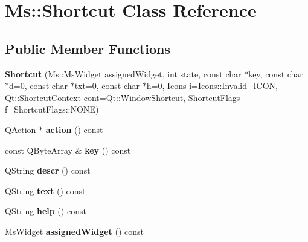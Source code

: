 \hypertarget{class_ms_1_1_shortcut}{}\section{Ms\+:\+:Shortcut Class Reference}
\label{class_ms_1_1_shortcut}
\subsection*{Public Member Functions}
\begin{DoxyCompactItemize}
\item 
\mbox{\label{class_ms_1_1_shortcut_ab4a874995fd1f7090eb9749d0b60297b}} 
{\bfseries Shortcut} (Ms\+::\+Ms\+Widget assigned\+Widget, int state, const char $\ast$key, const char $\ast$d=0, const char $\ast$txt=0, const char $\ast$h=0, Icons i=Icons\+::\+Invalid\+\_\+\+I\+C\+ON, Qt\+::\+Shortcut\+Context cont=Qt\+::\+Window\+Shortcut, Shortcut\+Flags f=Shortcut\+Flags\+::\+N\+O\+NE)
\item 
\mbox{\label{class_ms_1_1_shortcut_ac0c61a55d63d4387fcad2c9fefb4f341}} 
Q\+Action $\ast$ {\bfseries action} () const
\item 
\mbox{\label{class_ms_1_1_shortcut_acaaa1b84323299e13177c89084e10007}} 
const Q\+Byte\+Array \& {\bfseries key} () const
\item 
\mbox{\label{class_ms_1_1_shortcut_a37acff48b914714c274bc76dae6e564d}} 
Q\+String {\bfseries descr} () const
\item 
\mbox{\label{class_ms_1_1_shortcut_ac5039d07d10706e4a95f4f5a46174a0e}} 
Q\+String {\bfseries text} () const
\item 
\mbox{\label{class_ms_1_1_shortcut_a9cac389de9d18ba3a1c48a30b635ce28}} 
Q\+String {\bfseries help} () const
\item 
\mbox{\label{class_ms_1_1_shortcut_af344284673f1358e1284560a84030ea9}} 
Ms\+Widget {\bfseries assigned\+Widget} () const
\item 
\mbox{\label{class_ms_1_1_shortcut_a9941f7adbf3be765f2fc1e0a00f5f3af}} 

\end{DoxyCompactItemize}
